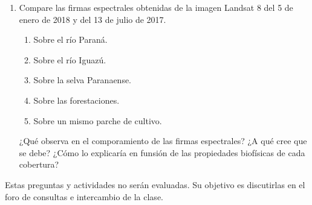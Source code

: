 \begin{enumerate}
  \item Compare las firmas espectrales obtenidas de la imagen Landsat 8 del 5 de enero de 2018 y del 13 de julio de 2017.
  \begin{enumerate}
    \item Sobre el río Paraná.
    \item Sobre el río Iguazú.
    \item Sobre la selva Paranaense.
    \item Sobre las forestaciones.
    \item Sobre un mismo parche de cultivo.
  \end{enumerate}
  ¿Qué observa en el comporamiento de las firmas espectrales? ¿A qué cree que se debe? ¿Cómo lo explicaría en funsión de las propiedades biofísicas de cada cobertura?
\end{enumerate}

Estas preguntas y actividades no serán evaluadas. Su objetivo es discutirlas en el foro de consultas e intercambio de la clase.
